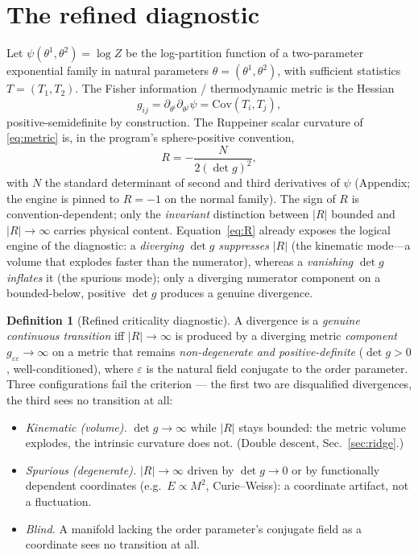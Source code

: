 \documentclass[a4paper,11pt]{article}
\theoremstyle{plain}
\theoremstyle{definition}
\newtheorem{definition}{Definition}
\theoremstyle{remark}
\newcommand{\Ric}{R}
\newcommand{\eps}{\varepsilon}
\newcommand{\detg}{\det g}
\begin{document}
\section{The refined diagnostic}\label{sec:diagnostic}
Let $\psi(\theta^1,\theta^2)=\log Z$ be the log-partition function of a two-parameter exponential family in
natural parameters $\theta=(\theta^1,\theta^2)$, with sufficient statistics $T=(T_1,T_2)$. The Fisher
information / thermodynamic metric is the Hessian
\begin{equation}
g_{ij}=\partial_{\theta^i}\partial_{\theta^j}\psi=\mathrm{Cov}(T_i,T_j),
\label{eq:metric}
\end{equation}
positive-semidefinite by construction. The Ruppeiner scalar curvature of \eqref{eq:metric} is, in the
program's sphere-positive convention,
\begin{equation}
\Ric=-\frac{N}{2(\detg)^2},
\label{eq:R}
\end{equation}
with $N$ the standard determinant of second and third derivatives of $\psi$ (Appendix; the engine is pinned
to $\Ric=-1$ on the normal family). The sign of $\Ric$ is convention-dependent; only the \emph{invariant}
distinction between $|\Ric|$ bounded and $|\Ric|\to\infty$ carries physical content. Equation~\eqref{eq:R}
already exposes the logical engine of the diagnostic: a \emph{diverging} $\detg$ \emph{suppresses} $|\Ric|$
(the kinematic mode---a volume that explodes faster than the numerator), whereas a \emph{vanishing} $\detg$
\emph{inflates} it (the spurious mode); only a diverging numerator component on a bounded-below, positive
$\detg$ produces a genuine divergence.

\begin{definition}[Refined criticality diagnostic]\label{def:diag}
A divergence is a \emph{genuine continuous transition} iff $|\Ric|\to\infty$ is produced by a diverging
metric \emph{component} $g_{\eps\eps}\to\infty$ on a metric that remains \emph{non-degenerate and
positive-definite} ($\detg>0$, well-conditioned), where $\eps$ is the natural field conjugate to the order
parameter. Three configurations fail the criterion --- the first two are disqualified divergences, the
third sees no transition at all:
\begin{itemize}
\item \emph{Kinematic (volume).} $\detg\to\infty$ while $|\Ric|$ stays bounded: the metric volume explodes,
      the intrinsic curvature does not. (Double descent, Sec.~\ref{sec:ridge}.)
\item \emph{Spurious (degenerate).} $|\Ric|\to\infty$ driven by $\detg\to0$ or by functionally dependent
      coordinates (e.g.\ $E\propto M^2$, Curie--Weiss): a coordinate artifact, not a fluctuation.
\item \emph{Blind.} A manifold lacking the order parameter's conjugate field as a coordinate sees no
      transition at all.
\end{itemize}
\end{definition}
\end{document}
